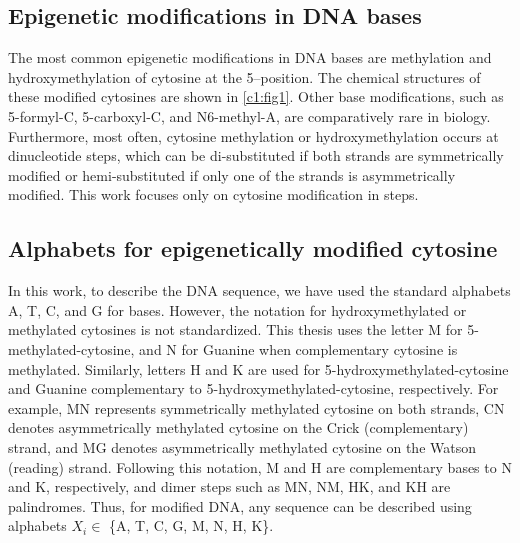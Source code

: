 \subsection{Epigenetic modifications in DNA bases}
The most common epigenetic modifications in DNA bases are methylation and hydroxymethylation of cytosine at the 5--position. 
The chemical structures of these modified cytosines are shown in \cref{c1:fig1}.
Other base modifications, such as 5-formyl-C, 5-carboxyl-C, and N6-methyl-A, are comparatively rare in biology.
Furthermore, most often, cytosine methylation or hydroxymethylation occurs at \cpg dinucleotide steps, which can be di-substituted if both strands are symmetrically modified or hemi-substituted if only one of the strands is asymmetrically modified.
This work focuses only on cytosine modification in \cpg steps.

\subsection{Alphabets for epigenetically modified cytosine}
In this work, to describe the DNA sequence, we have used the standard alphabets A, T, C, and G for bases. 
However, the notation for hydroxymethylated or methylated cytosines is not standardized.
This thesis uses the letter M for 5-methylated-cytosine, and N for Guanine when complementary cytosine is methylated.
Similarly, letters H and K are used for 5-hydroxymethylated-cytosine and Guanine complementary to 5-hydroxymethylated-cytosine, respectively.
For example, MN represents symmetrically methylated cytosine on both strands, CN denotes asymmetrically methylated cytosine on the Crick (complementary) strand, and MG denotes asymmetrically methylated cytosine on the Watson (reading) strand.
Following this notation, M and H are complementary bases to N and K, respectively, and dimer steps such as MN, NM, HK, and KH are palindromes.
Thus, for modified DNA, any sequence can be described using alphabets $X_i \in$ \{A, T, C, G, M, N, H, K\}.

